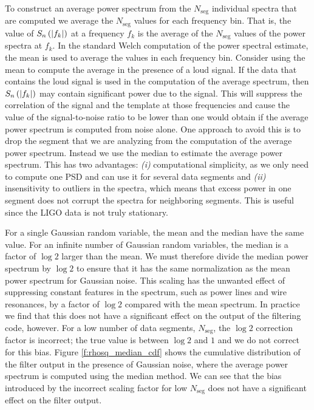 To construct an average power spectrum from the $N_\mathrm{seg}$ individual
spectra that are computed we average the $N_\mathrm{seg}$ values for each
frequency bin. That is, the value of $S_n\left(\left|f_{k}\right|\right)$ at a frequency $f_k$ is the
average of the $N_\mathrm{seg}$ values of the power spectra at $f_k$. In the
standard Welch computation of the power spectral estimate, the mean is used to
average the values in each frequency bin.  Consider using the mean to compute
the average in the presence of a loud signal. If the data that contains the
loud signal is used in the computation of the average spectrum, then $S_n\left(\left|f_{k}\right|\right)$
may contain significant power due to the signal. This will suppress the
correlation of the signal and the template at those frequencies and cause the
value of the signal-to-noise ratio to be lower than one would obtain if the
average power spectrum is computed from noise alone.  One approach to avoid
this is to drop the segment that we are analyzing from the computation of the
average power spectrum.  Instead we use the median to estimate the average
power spectrum. This has two advantages: \emph{(i)} computational simplicity,
as we only need to compute one PSD and can use it for several data segments
and \emph{(ii)} insensitivity to outliers in the spectra, which means that
excess power in one segment does not corrupt the spectra for neighboring
segments. This is useful since the LIGO data is not truly stationary.

For a single Gaussian random variable, the mean and the median have the same
value. For an infinite number of Gaussian random variables, the median is a
factor of $\log 2$ larger than the mean. We must therefore divide the median
power spectrum by $\log 2$ to ensure that it has the same normalization as the
mean power spectrum for Gaussian noise. This scaling has the unwanted effect
of suppressing constant features in the spectrum, such as power lines and wire
resonances, by a factor of $\log 2$ compared with the mean spectrum. In
practice we find that this does not have a significant effect on the output of
the filtering code, however.  For a low number of data segments,
$N_\mathrm{seg}$, the $\log 2$ correction factor is incorrect; the true value
is between $\log 2$ and $1$ and we do not correct for this bias. Figure
\ref{f:rhosq_median_cdf} shows the cumulative distribution of the filter
output in the presence of Gaussian noise, where the average power spectrum is
computed using the median method.  We can see that the bias introduced by the
incorrect scaling factor for low $N_\mathrm{seg}$ does not have a significant
effect on the filter output.

